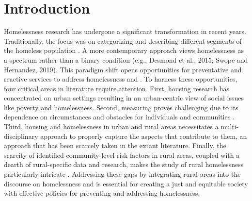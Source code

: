 \chapter{Introduction} 

Homelessness research has undergone a significant transformation in recent years. Traditionally, the focus was on categorizing and describing different segments of the homeless population \citep{lee_homelessness_2021}. A more contemporary approach views homelessness as a spectrum rather than a binary condition (e.g., Desmond et al., 2015; Swope and Hernandez, 2019). This paradigm shift opens opportunities for preventative and reactive services to address homelessness and \hs. To harness these opportunities, four critical areas in literature require attention. First, housing research has concentrated on urban settings resulting in an urban-centric view of social issues like poverty and homelessness. Second, measuring \hs proves challenging due to its dependence on circumstances and obstacles for individuals and communities \citep{leifheit_building_2022}. Third, housing and homelessness in urban and rural areas necessitates a multi-disciplinary approach to properly capture the aspects that contribute to them, an approach that has been scarcely taken in the extant literature.  Finally, the scarcity of identified community-level risk factors in rural areas, coupled with a dearth of rural-specific data and research, makes the study of rural homelessness particularly intricate \citep{gleason_using_2021}. Addressing these gaps by integrating rural areas into the discourse on homelessness and \hs is essential for creating a just and equitable society with effective policies for preventing and addressing homelessness\citep{oregan_how_2021}.


